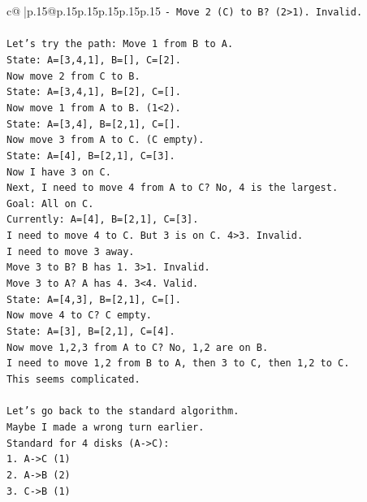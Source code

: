 \documentclass{article}
\begin{document}
{\begin{supertabular}{c@{$\;$}|p{.15\linewidth}@{}p{.15\linewidth}p{.15\linewidth}p{.15\linewidth}p{.15\linewidth}p{.15\linewidth}}
{{{\texttt{{-} Move 2 (C) to B? (2>1). Invalid.} \\
\\ 
\texttt{Let's try the path: Move 1 from B to A.} \\
\texttt{State: A={[}3,4,1{]}, B={[}{]}, C={[}2{]}.} \\
\texttt{Now move 2 from C to B.} \\
\texttt{State: A={[}3,4,1{]}, B={[}2{]}, C={[}{]}.} \\
\texttt{Now move 1 from A to B. (1<2).} \\
\texttt{State: A={[}3,4{]}, B={[}2,1{]}, C={[}{]}.} \\
\texttt{Now move 3 from A to C. (C empty).} \\
\texttt{State: A={[}4{]}, B={[}2,1{]}, C={[}3{]}.} \\
\texttt{Now I have 3 on C.} \\
\texttt{Next, I need to move 4 from A to C? No, 4 is the largest.} \\
\texttt{Goal: All on C.} \\
\texttt{Currently: A={[}4{]}, B={[}2,1{]}, C={[}3{]}.} \\
\texttt{I need to move 4 to C. But 3 is on C. 4>3. Invalid.} \\
\texttt{I need to move 3 away.} \\
\texttt{Move 3 to B? B has 1. 3>1. Invalid.} \\
\texttt{Move 3 to A? A has 4. 3<4. Valid.} \\
\texttt{State: A={[}4,3{]}, B={[}2,1{]}, C={[}{]}.} \\
\texttt{Now move 4 to C? C empty.} \\
\texttt{State: A={[}3{]}, B={[}2,1{]}, C={[}4{]}.} \\
\texttt{Now move 1,2,3 from A to C? No, 1,2 are on B.} \\
\texttt{I need to move 1,2 from B to A, then 3 to C, then 1,2 to C.} \\
\texttt{This seems complicated.} \\
\\ 
\texttt{Let's go back to the standard algorithm.} \\
\texttt{Maybe I made a wrong turn earlier.} \\
\texttt{Standard for 4 disks (A{-}>C):} \\
\texttt{1. A{-}>C (1)} \\
\texttt{2. A{-}>B (2)} \\
\texttt{3. C{-}>B (1)} \\
}}}
\end{supertabular}}
\end{document}
